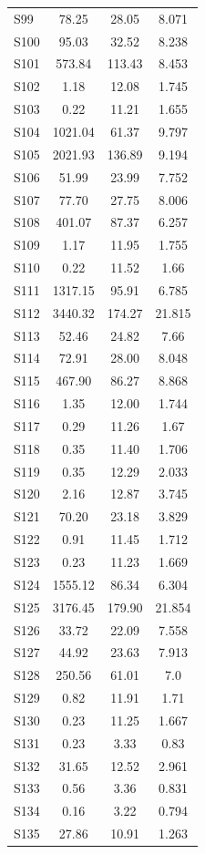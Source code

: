 {\begin{longtable}{l S[table-format=7.2] S[table-format=7.2] S[table-format=7.3]}
S99 & 78.25 & 28.05 & 8.071 \\
S100 & 95.03 & 32.52 & 8.238 \\
S101 & 573.84 & 113.43 & 8.453 \\
S102 & 1.18 & 12.08 & 1.745 \\
S103 & 0.22 & 11.21 & 1.655 \\
S104 & 1021.04 & 61.37 & 9.797 \\
S105 & 2021.93 & 136.89 & 9.194 \\
S106 & 51.99 & 23.99 & 7.752 \\
S107 & 77.70 & 27.75 & 8.006 \\
S108 & 401.07 & 87.37 & 6.257 \\
S109 & 1.17 & 11.95 & 1.755 \\
S110 & 0.22 & 11.52 & 1.66 \\
S111 & 1317.15 & 95.91 & 6.785 \\
S112 & 3440.32 & 174.27 & 21.815 \\
S113 & 52.46 & 24.82 & 7.66 \\
S114 & 72.91 & 28.00 & 8.048 \\
S115 & 467.90 & 86.27 & 8.868 \\
S116 & 1.35 & 12.00 & 1.744 \\
S117 & 0.29 & 11.26 & 1.67 \\
S118 & 0.35 & 11.40 & 1.706 \\
S119 & 0.35 & 12.29 & 2.033 \\
S120 & 2.16 & 12.87 & 3.745 \\
S121 & 70.20 & 23.18 & 3.829 \\
S122 & 0.91 & 11.45 & 1.712 \\
S123 & 0.23 & 11.23 & 1.669 \\
S124 & 1555.12 & 86.34 & 6.304 \\
S125 & 3176.45 & 179.90 & 21.854 \\
S126 & 33.72 & 22.09 & 7.558 \\
S127 & 44.92 & 23.63 & 7.913 \\
S128 & 250.56 & 61.01 & 7.0 \\
S129 & 0.82 & 11.91 & 1.71 \\
S130 & 0.23 & 11.25 & 1.667 \\
S131 & 0.23 & 3.33 & 0.83 \\
S132 & 31.65 & 12.52 & 2.961 \\
S133 & 0.56 & 3.36 & 0.831 \\
S134 & 0.16 & 3.22 & 0.794 \\
S135 & 27.86 & 10.91 & 1.263 \\

\end{longtable}}
